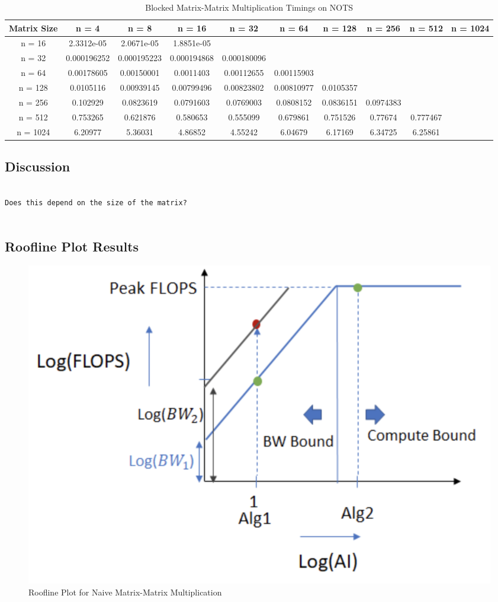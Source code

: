 \documentclass{article}
\begin{document}
\begin{table}[ht!]
    \caption{Blocked Matrix-Matrix Multiplication Timings on NOTS}
    \centering
    \begin{tabular}{|c|c|c|c|c|c|c|c|c|c|}
        \hline
        Matrix Size & n = 4 & n = 8 & n = 16 & n = 32 & n = 64 & n = 128 & n = 256 & n = 512 & n = 1024 \\
        \hline
        n = 16 & 2.3312e-05 & 2.0671e-05 & 1.8851e-05 \\
        \hline
        n = 32 & 0.000196252 & 0.000195223 & 0.000194868 & 0.000180096 \\
        \hline
        n = 64 & 0.00178605 & 0.00150001 & 0.0011403 & 0.00112655 & 0.00115903 \\
        \hline
        n = 128 & 0.0105116 & 0.00939145 & 0.00799496 & 0.00823802 & 0.00810977 & 0.0105357 \\
        \hline
        n = 256 & 0.102929 & 0.0823619 & 0.0791603 & 0.0769003 & 0.0808152 & 0.0836151 & 0.0974383 \\
        \hline
        n = 512 & 0.753265 & 0.621876 & 0.580653 & 0.555099 & 0.679861 & 0.751526 & 0.77674 & 0.777467 \\
        \hline 
        n = 1024 & 6.20977 & 5.36031 & 4.86852 & 4.55242 & 6.04679 & 6.17169 & 6.34725 & 6.25861 \\
        \hline
    \end{tabular}
\end{table}

\subsection{Discussion}

\begin{verbatim}

Does this depend on the size of the matrix?
    
\end{verbatim}

\subsection{Roofline Plot Results}
\begin{figure}[!htb]
    \centering
    \includegraphics[width=0.8\linewidth]{roofline_plot.png}
    \caption{Roofline Plot for Naive Matrix-Matrix Multiplication}
\end{figure}
\end{document}

